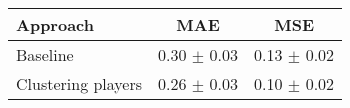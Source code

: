    \begin{tabular}{l c c}
    \toprule
    
    Approach  & MAE & MSE \\ %
    
    \midrule
    Baseline            & 0.30 $\pm$ 0.03  & 0.13 $\pm$ 0.02  \\ %
    Clustering players  & 0.26 $\pm$ 0.03  & 0.10 $\pm$ 0.02  \\ %
    

    \bottomrule
        
    \end{tabular}
    
    
    
    
    

        
    
    